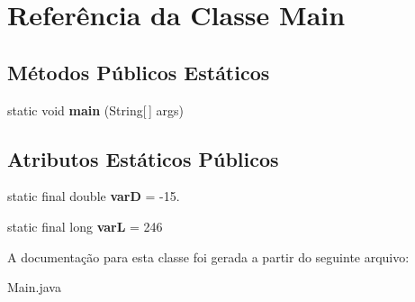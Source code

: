 \hypertarget{classMain}{}\section{Referência da Classe Main}
\label{classMain}
\subsection*{Métodos Públicos Estáticos}
\begin{DoxyCompactItemize}
\item 
\mbox{\label{classMain_a8a5d0f827edddff706cc0e6740d0579a}} 
static void {\bfseries main} (String\mbox{[}$\,$\mbox{]} args)
\end{DoxyCompactItemize}
\subsection*{Atributos Estáticos Públicos}
\begin{DoxyCompactItemize}
\item 
\mbox{\label{classMain_a93ce78827008b629fd0afc68309b9413}} 
static final double {\bfseries varD} = -\/15.
\item 
\mbox{\label{classMain_ae9ca95a4f1cfc8a167b4afd7af44b17e}} 
static final long {\bfseries varL} = 246
\end{DoxyCompactItemize}


A documentação para esta classe foi gerada a partir do seguinte arquivo\+:\begin{DoxyCompactItemize}
\item 
Main.\+java\end{DoxyCompactItemize}
